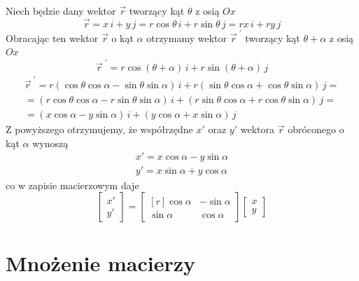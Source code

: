 \documentclass[12pt,a4paper,leqno]{article}
\numberwithin{equation}{section}
\begin{document}
Niech będzie dany wektor $\vec{r}$ tworzący kąt $\theta$ z osią $Ox$
\begin{equation}
\vec{r} = x \, i + y \, j = r \cos \theta \, i + r \sin \theta \, j = r x \, i + r y \, j
\end{equation}
Obracając ten wektor $\vec{r}$ o kąt $\alpha$ 
otrzymamy wektor $\vec{r}^{\,\,'}$ tworzący kąt $\theta + \alpha$ z osią $Ox$
\begin{equation}
\vec{r}^{\,\,'} = r \cos( \theta + \alpha ) \, i + r \sin( \theta + \alpha ) \, j
\end{equation}
\begin{eqnarray}
\vec{r}^{\,\,'} = r (\cos \theta \cos \alpha - \sin \theta \sin \alpha) \, i
+                 r (\sin \theta \cos \alpha + \cos \theta \sin \alpha) \, j         =  \\ \nonumber
=
( r \cos \theta \cos \alpha - r \sin \theta \sin \alpha ) \, i 
+
( r \sin \theta \cos \alpha + r \cos \theta \sin \alpha ) \, j                       =  \\ \nonumber
=
( x \cos \alpha - y \sin \alpha ) \, i 
+
( y \cos \alpha + x \sin \alpha ) \, j 
\end{eqnarray}
Z powyższego otrzymujemy, że współrzędne $x'$ oraz $y'$ wektora $\vec{r}$ obróconego o kąt $\alpha$  wynoszą
\begin{eqnarray}
x' = x \cos \alpha - y \sin \alpha      \\ 
y' = x \sin \alpha + y \cos \alpha
\end{eqnarray}
co w zapisie macierzowym daje
\begin{equation}
\begin{bmatrix}
x' \\ 
y' 
\end{bmatrix}
=
\begin{bmatrix*}[r]
 \cos \alpha  & -\sin \alpha  \\
 \sin \alpha  &  \cos \alpha
\end{bmatrix*}
\begin{bmatrix}
x \\ 
y 
\end{bmatrix}
\end{equation}



\section{Mnożenie macierzy}\label{sec3}
\end{document}
